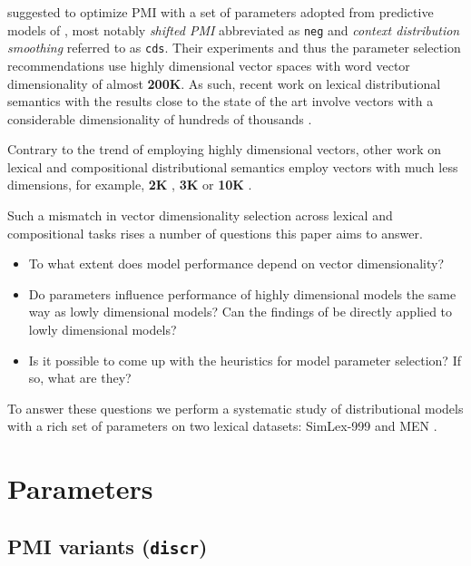 \documentclass[11pt,letterpaper]{article}
\begin{document}
 suggested to optimize PMI with a  set of parameters adopted from predictive models of , most notably \emph{shifted PMI} abbreviated as \texttt{neg} and \emph{context distribution smoothing} referred to as \texttt{cds}. Their experiments and thus the parameter selection recommendations use highly dimensional vector spaces with word vector  dimensionality of almost \textbf{200K}. As such, recent work on lexical distributional semantics with the results close to the state of the art involve vectors with a considerable dimensionality of hundreds of thousands \cite{baroni-dinu-kruszewski:2014:P14-1,kiela-clark:2014:CVSC}.

Contrary to the trend of employing highly dimensional vectors, other work on lexical and compositional distributional semantics employ vectors with much less dimensions, for example, \textbf{2K} \cite{Grefenstette:2011:ESC:2145432.2145580,kartsadrqpl2014,milajevs-EtAl:2014:EMNLP2014}, \textbf{3K} \cite{Dinu:2010:MDS:1870658.1870771,milajevs-purver:2014:CVSC} or \textbf{10K} \cite{polajnar-clark:2014:EACL,Baroni2010nouns}.

Such a mismatch in vector dimensionality selection across lexical and compositional tasks rises a number of questions this paper aims to answer.
\begin{itemize}
\item To what extent does model performance depend on vector dimensionality?
\item Do parameters influence performance of highly dimensional models the same way as lowly dimensional models? Can the findings of  be directly applied to lowly dimensional models?
\item Is it possible to come up with the heuristics for model parameter selection? If so, what are they?
\end{itemize}

To answer these questions we perform a systematic study of distributional models with a rich set of parameters on two lexical datasets: SimLex-999 \cite{hill2014simlex} and MEN \cite{Bruni:2014:MDS:2655713.2655714}.



\section{Parameters}
\label{sec:parameters}

\subsection{PMI variants (\texttt{discr})}
\label{sec:pmi-variants}
\end{document}
